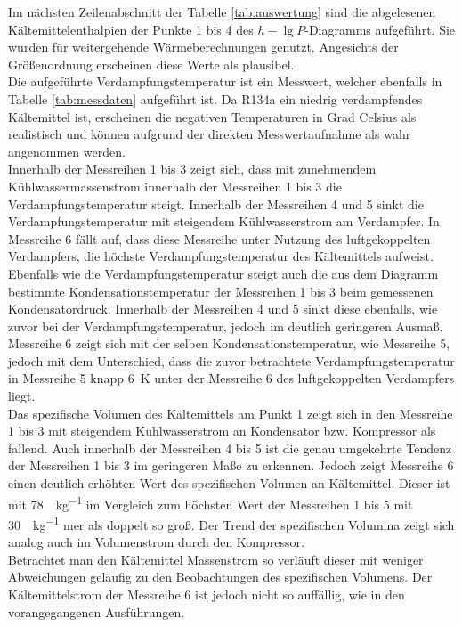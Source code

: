 Im nächsten Zeilenabschnitt der Tabelle \ref{tab:auswertung} sind die abgelesenen Kältemittelenthalpien der Punkte 1 bis 4 des $h-\lg{P}$-Diagramms aufgeführt. Sie wurden für weitergehende Wärmeberechnungen genutzt. Angesichts der Größenordnung erscheinen diese Werte als plausibel.\\

Die aufgeführte Verdampfungstemperatur ist ein Messwert, welcher ebenfalls in Tabelle \ref{tab:messdaten} aufgeführt ist. Da R134a ein niedrig verdampfendes Kältemittel ist, erscheinen die negativen Temperaturen in Grad Celsius als realistisch und können aufgrund der direkten Messwertaufnahme als wahr angenommen werden.\\
Innerhalb der Messreihen 1 bis 3 zeigt sich, dass mit zunehmendem Kühlwassermassenstrom innerhalb der Messreihen 1 bis 3 die Verdampfungstemperatur steigt. Innerhalb der Messreihen 4 und 5 sinkt die Verdampfungstemperatur mit steigendem Kühlwasserstrom am Verdampfer. In Messreihe 6 fällt auf, dass diese Messreihe unter Nutzung des luftgekoppelten Verdampfers, die höchste Verdampfungstemperatur des Kältemittels aufweist.\\

Ebenfalls wie die Verdampfungstemperatur steigt auch die aus dem Diagramm bestimmte Kondensationstemperatur der Messreihen 1 bis 3 beim gemessenen Kondensatordruck. Innerhalb der Messreihen 4 und 5 sinkt diese ebenfalls, wie zuvor bei der Verdampfungstemperatur, jedoch im deutlich geringeren Ausmaß. Messreihe 6 zeigt sich mit der selben Kondensationstemperatur, wie Messreihe 5,  jedoch mit dem Unterschied, dass die zuvor betrachtete Verdampfungstemperatur in Messreihe 5 knapp \SI{6}{\kelvin} unter der Messreihe 6 des luftgekoppelten Verdampfers liegt.\\

Das spezifische Volumen des Kältemittels am Punkt 1 zeigt sich in den Messreihe 1 bis 3 mit steigendem Kühlwasserstrom an Kondensator bzw. Kompressor als fallend. Auch innerhalb der Messreihen 4 bis 5 ist die genau umgekehrte Tendenz der Messreihen 1 bis 3 im geringeren Maße zu erkennen. Jedoch zeigt Messreihe 6 einen deutlich erhöhten Wert des spezifischen Volumen an Kältemittel. Dieser ist mit \SI{78}{\kmeter \per \kg} im Vergleich zum höchsten Wert der Messreihen 1 bis 5 mit \SI{30}{\kmeter \per \kg} mer als doppelt so groß.
Der Trend der spezifischen Volumina zeigt sich analog auch im Volumenstrom durch den Kompressor.\\
Betrachtet man den Kältemittel Massenstrom so verläuft dieser mit weniger Abweichungen geläufig zu den Beobachtungen des spezifischen Volumens. Der Kältemittelstrom der Messreihe 6 ist jedoch nicht so auffällig, wie in den vorangegangenen Ausführungen.

